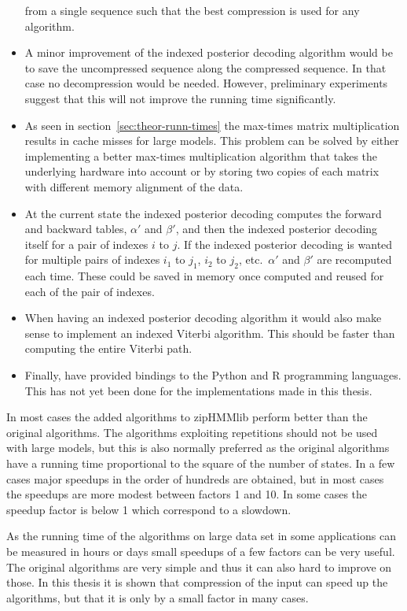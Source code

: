 \begin{itemize}
  from a single sequence such that the best compression is used for any algorithm.
\item A minor improvement of the indexed posterior decoding algorithm would be
  to save the uncompressed sequence along the compressed sequence. In that case
  no decompression would be needed. However, preliminary experiments suggest
  that this will not improve the running time significantly.
\item As seen in section~\ref{sec:theor-runn-times} the max-times matrix
  multiplication results in cache misses for large models. This problem can be
  solved by either implementing a better max-times multiplication algorithm
  that takes the underlying hardware into account or by storing two copies of
  each matrix with different memory alignment of the data.
\item At the current state the indexed posterior decoding computes the forward
  and backward tables, $\alpha'$ and $\beta'$, and then the indexed posterior
  decoding itself for a pair of indexes $i$ to $j$. If the indexed posterior
  decoding is wanted for multiple pairs of indexes $i_1$ to $j_1$, $i_2$ to
  $j_2$, etc.\ $\alpha'$ and $\beta'$ are recomputed each time. These could be
  saved in memory once computed and reused for each of the pair of indexes.
\item When having an indexed posterior decoding algorithm it would also make
  sense to implement an indexed Viterbi algorithm. This should be faster than
  computing the entire Viterbi path.
\item Finally, \citet{sand2013ziphmmlib} have provided bindings to the Python
  and R programming languages. This has not yet been done for the
  implementations made in this thesis.
\end{itemize}

In most cases the added algorithms to zipHMMlib perform better than the original
algorithms. The algorithms exploiting repetitions should not be used with large models, but this is
also normally preferred as the original algorithms have a running time
proportional to the square of the number of states. In a few cases major
speedups in the order of hundreds are obtained, but in most cases the speedups
are more modest between factors 1 and 10. In some cases the speedup factor is
below 1 which correspond to a slowdown.

As the running time of the algorithms on large data set in some applications
can be measured in hours or days small speedups of a few factors can be very
useful. The original algorithms are very simple and thus it can also hard to
improve on those. In this thesis it is shown that compression of the input can
speed up the algorithms, but that it is only by a small factor in many cases.

